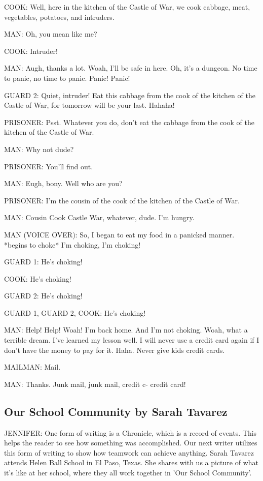COOK:
Well, here in the kitchen of the Castle of War, we cook cabbage, meat, vegetables, potatoes, and intruders.

MAN:
Oh, you mean like me?

COOK:
Intruder!

MAN:
Augh, thanks a lot.
Woah, I'll be safe in here.
Oh, it's a dungeon.
No time to panic, no time to panic.
Panic!
Panic!

GUARD 2:
Quiet, intruder!
Eat this cabbage from the cook of the kitchen of the Castle of War, for tomorrow will be your last.
Hahaha!

PRISONER:
Psst.
Whatever you do, don't eat the cabbage from the cook of the kitchen of the Castle of War.

MAN:
Why not dude?

PRISONER:
You'll find out.

MAN:
Eugh, bony.
Well who are you?

PRISONER:
I'm the cousin of the cook of the kitchen of the Castle of War.

MAN:
Cousin Cook Castle War, whatever, dude.
I'm hungry.

MAN (VOICE OVER):
So, I began to eat my food in a panicked manner.
*begins to choke*
I'm choking, I'm choking!

GUARD 1:
He's choking!

COOK:
He's choking!

GUARD 2:
He's choking!

GUARD 1, GUARD 2, COOK:
He's choking!

MAN:
Help!
Help!
Woah!
I'm back home.
And I'm not choking.
Woah, what a terrible dream.
I've learned my lesson well.
I will never use a credit card again if I don't have the money to pay for it.
Haha.
Never give kids credit cards.

MAILMAN:
Mail.

MAN:
Thanks.
Junk mail, junk mail, credit c- credit card!

\subsection{Our School Community by Sarah Tavarez}

JENNIFER:
One form of writing is a Chronicle, which is a record of events.
This helps the reader to see how something was accomplished.
Our next writer utilizes this form of writing to show how teamwork can achieve anything.
Sarah Tavarez attends Helen Ball School in El Paso, Texas.
She shares with us a picture of what it's like at her school, where they all work together in 'Our School Community'.

